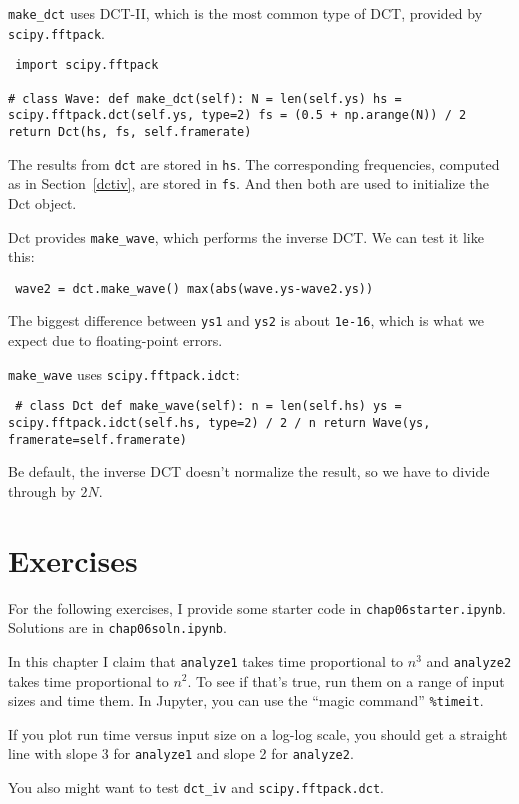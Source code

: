 \documentclass[12pt]{book} \usepackage[width=5.5in,height=8.5in, hmarginratio=3:2,vmarginratio=1:1]{geometry}
\begin{document}
\verb"make_dct" uses DCT-II, which is the most common type of DCT, provided by {\tt scipy.fftpack}. 

\begin{verbatim} import scipy.fftpack 

# class Wave: def make_dct(self): N = len(self.ys) hs = scipy.fftpack.dct(self.ys, type=2) fs = (0.5 + np.arange(N)) / 2 return Dct(hs, fs, self.framerate) \end{verbatim} 

The results from {\tt dct} are stored in {\tt hs}. The corresponding frequencies, computed as in Section~\ref{dctiv}, are stored in {\tt fs}. And then both are used to initialize the Dct object. 

Dct provides \verb"make_wave", which performs the inverse DCT. We can test it like this: 

\begin{verbatim} wave2 = dct.make_wave() max(abs(wave.ys-wave2.ys)) \end{verbatim} 

The biggest difference between {\tt ys1} and {\tt ys2} is about {\tt 1e-16}, which is what we expect due to floating-point errors. 

\verb"make_wave" uses {\tt scipy.fftpack.idct}: 

\begin{verbatim} # class Dct def make_wave(self): n = len(self.hs) ys = scipy.fftpack.idct(self.hs, type=2) / 2 / n return Wave(ys, framerate=self.framerate) \end{verbatim} 

Be default, the inverse DCT doesn't normalize the result, so we have to divide through by $2N$. 

\section{Exercises} 

For the following exercises, I provide some starter code in {\tt chap06starter.ipynb}. Solutions are in {\tt chap06soln.ipynb}. 

\begin{exercise} In this chapter I claim that {\tt analyze1} takes time proportional to $n^3$ and {\tt analyze2} takes time proportional to $n^2$. To see if that's true, run them on a range of input sizes and time them. In Jupyter, you can use the ``magic command'' \texttt{\%timeit}. 

If you plot run time versus input size on a log-log scale, you should get a straight line with slope 3 for {\tt analyze1} and slope 2 for {\tt analyze2}. 

You also might want to test \verb"dct_iv" and {\tt scipy.fftpack.dct}. 

\end{exercise} 
\end{document}
